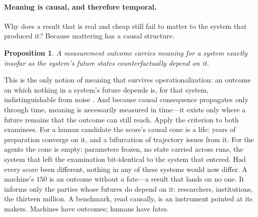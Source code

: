 \documentclass[11pt]{article}
\theoremstyle{plain}
\newtheorem{proposition}{Proposition}
\begin{document}
\paragraph{Meaning is causal, and therefore temporal.}
Why does a result that is real and cheap still fail to matter to the
system that produced it? Because mattering has a causal structure.
\begin{proposition}\label{prop:meaning}
A measurement outcome carries meaning for a system exactly insofar as
the system's future states counterfactually depend on it.
\end{proposition}
This is the only notion of meaning that survives operationalization: an
outcome on which nothing in a system's future depends is, for that
system, indistinguishable from noise
\citep[cf.][]{dretske1981knowledge,pearl2009causality}. And because causal consequence
propagates only through time, meaning is necessarily measured in
time---it exists only where a future remains that the outcome can still
reach. Apply the criterion to both examinees. For a human candidate the
score's causal cone is a life: years of preparation converge on it, and
a bifurcation of trajectory issues from it. For the agents the cone is
empty: parameters frozen, no state carried across runs, the system that
left the examination bit-identical to the system that entered. Had every
score been different, nothing in any of these systems would now differ.
A machine's $150$ is an outcome without a fate---a result that lands on
no one. It informs only the parties whose futures do depend on it:
researchers, institutions, the thirteen million. A benchmark, read
causally, is an instrument pointed at its makers. Machines have
outcomes; humans have fates.
\end{document}
